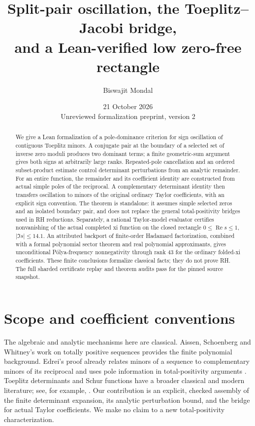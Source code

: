 \documentclass[11pt]{amsart}
\title[Split-pair oscillation and a verified low rectangle]{Split-pair oscillation, the Toeplitz--Jacobi bridge,\\and a Lean-verified low zero-free rectangle}
\author{Biswajit Mondal}
\date{21 October 2026\\Unreviewed formalization preprint, version 2}
\newcommand{\Repart}{\operatorname{Re}}
\begin{document}
\begin{abstract}
We give a Lean formalization of a pole-dominance criterion for sign oscillation of contiguous Toeplitz minors. A conjugate pair at the boundary of a selected set of inverse zero moduli produces two dominant terms; a finite geometric-sum argument gives both signs at arbitrarily large ranks. Repeated-pole cancellation and an ordered subset-product estimate control determinant perturbations from an analytic remainder. For an entire function, the remainder and its coefficient identity are constructed from actual simple poles of the reciprocal. A complementary determinant identity then transfers oscillation to minors of the original ordinary Taylor coefficients, with an explicit sign convention. The theorem is standalone: it assumes simple selected zeros and an isolated boundary pair, and does not replace the general total-positivity bridges used in RH reductions. Separately, a rational Taylor-model evaluator certifies nonvanishing of the actual completed xi function on the closed rectangle $0\le\Repart s\le1$, $|\Im s|\le14.1$. An attributed backport of finite-order Hadamard factorization, combined with a formal polynomial sector theorem and real polynomial approximants, gives unconditional P\'olya-frequency nonnegativity through rank 43 for the ordinary folded-xi coefficients. These finite conclusions formalize classical facts; they do not prove RH. The full sharded certificate replay and theorem audits pass for the pinned source snapshot.
\end{abstract}
\maketitle

\section{Scope and coefficient conventions}
The algebraic and analytic mechanisms here are classical. Aissen, Schoenberg and Whitney's work on totally positive sequences \cite{asw} provides the finite polynomial background. Edrei's proof already relates minors of a sequence to complementary minors of its reciprocal and uses pole information in total-positivity arguments \cite{edrei}. Toeplitz determinants and Schur functions have a broader classical and modern literature; see, for example, \cite{bumpdiaconis}. Our contribution is an explicit, checked assembly of the finite determinant expansion, its analytic perturbation bound, and the bridge for actual Taylor coefficients. We make no claim to a new total-positivity characterization.
\end{document}
